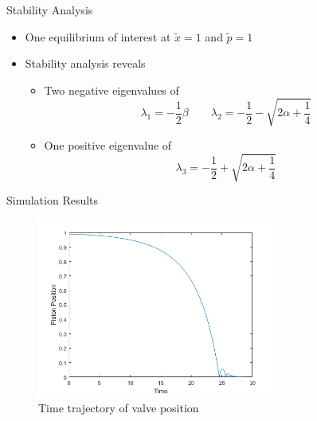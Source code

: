 \documentclass[svgnames,fragile]{beamer}
\begin{document}
\begin{frame}{Stability Analysis}
\begin{itemize}
    \item<1-> One equilibrium of interest at $\tilde{x} = 1$ and $\tilde{p} = 1$
    \item<2-> Stability analysis reveals
    \begin{itemize}
        \item<3-> Two negative eigenvalues of
        \begin{equation*}
            \lambda_1 = - \frac{1}{2} \beta \qquad
            \lambda_2 = - \frac{1}{2} - \sqrt{2 \alpha + \frac{1}{4}}
        \end{equation*}
        \item<4-> One positive eigenvalue of
        \begin{equation*}
            \lambda_3 = - \frac{1}{2} + \sqrt{2 \alpha + \frac{1}{4}}
        \end{equation*}
    \end{itemize}
\end{itemize}
\end{frame}

\begin{frame}{Simulation Results}
\begin{figure}
    \centering
    \includegraphics[width=0.7\textwidth]{Figures/Example/PositionTimeTrajectory.png}
    \caption{Time trajectory of valve position}
\end{figure}
\end{frame}
\end{document}
